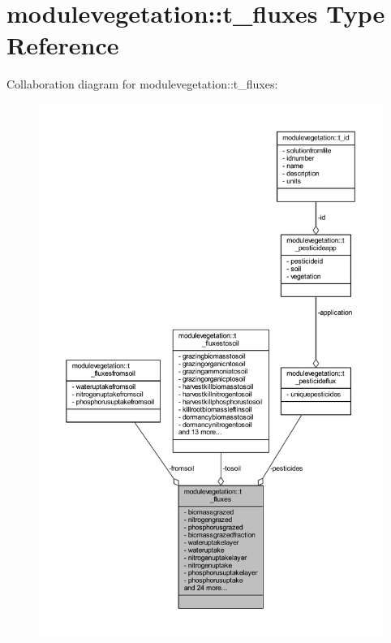 \hypertarget{structmodulevegetation_1_1t__fluxes}{}\section{modulevegetation\+:\+:t\+\_\+fluxes Type Reference}
\label{structmodulevegetation_1_1t__fluxes}


Collaboration diagram for modulevegetation\+:\+:t\+\_\+fluxes\+:\nopagebreak
\begin{figure}[H]
\begin{center}
\leavevmode
\includegraphics[width=350pt]{structmodulevegetation_1_1t__fluxes__coll__graph}
\end{center}
\end{figure}
